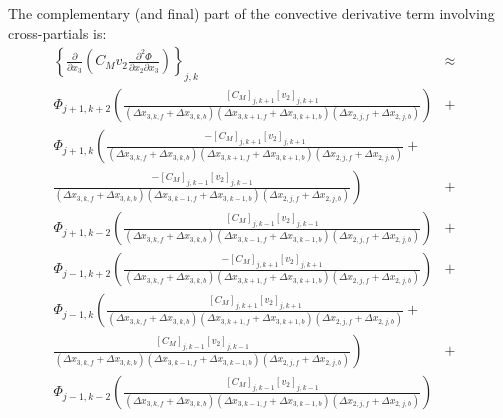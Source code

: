 \documentclass[11pt,letterpaper]{article}
\begin{document}
The complementary (and final) part of the convective derivative term involving cross-partials is:  
\begin{eqnarray}
\left\{ \frac{\partial}{\partial x_3} \left( C_M v_2 \frac{\partial^2 \Phi }{\partial x_2 \partial x_3} \right) \right\}_{j,k} &\approx& \nonumber \\
\Phi_{j+1,k+2} \left( \frac{[C_M]_{j,k+1} [v_2]_{j,k+1} }{ \left( \Delta x_{3,k,f}+\Delta x_{3,k,b} \right) \left( \Delta x_{3,k+1,f}+\Delta x_{3,k+1,b} \right) \left( \Delta x_{2,j,f}+\Delta x_{2,j,b} \right) } \right) &+& \nonumber \\
\Phi_{j+1,k} \left( \frac{-[C_M]_{j,k+1} [v_2]_{j,k+1} }{ \left( \Delta x_{3,k,f}+\Delta x_{3,k,b} \right) \left( \Delta x_{3,k+1,f}+\Delta x_{3,k+1,b} \right) \left( \Delta x_{2,j,f}+\Delta x_{2,j,b} \right) } \right. + &~& \nonumber \\
\left. \frac{-[C_M]_{j,k-1} [v_2]_{j,k-1} }{ \left( \Delta x_{3,k,f}+\Delta x_{3,k,b} \right) \left( \Delta x_{3,k-1,f}+\Delta x_{3,k-1,b} \right) \left( \Delta x_{2,j,f}+\Delta x_{2,j,b} \right) } \right) &+& \nonumber \\
\Phi_{j+1,k-2} \left( \frac{[C_M]_{j,k-1} [v_2]_{j,k-1} }{ \left( \Delta x_{3,k,f}+\Delta x_{3,k,b} \right) \left( \Delta x_{3,k-1,f}+\Delta x_{3,k-1,b} \right) \left( \Delta x_{2,j,f}+\Delta x_{2,j,b} \right) } \right) &+& \nonumber \\
\Phi_{j-1,k+2} \left( \frac{-[C_M]_{j,k+1} [v_2]_{j,k+1} }{ \left( \Delta x_{3,k,f}+\Delta x_{3,k,b} \right) \left( \Delta x_{3,k+1,f}+\Delta x_{3,k+1,b} \right) \left( \Delta x_{2,j,f}+\Delta x_{2,j,b} \right) } \right) &+& \nonumber \\
\Phi_{j-1,k} \left( \frac{[C_M]_{j,k+1} [v_2]_{j,k+1} }{ \left( \Delta x_{3,k,f}+\Delta x_{3,k,b} \right) \left( \Delta x_{3,k+1,f}+\Delta x_{3,k+1,b} \right) \left( \Delta x_{2,j,f}+\Delta x_{2,j,b} \right) } \right. + &~& \nonumber \\
\left. \frac{[C_M]_{j,k-1} [v_2]_{j,k-1} }{ \left( \Delta x_{3,k,f}+\Delta x_{3,k,b} \right) \left( \Delta x_{3,k-1,f}+\Delta x_{3,k-1,b} \right) \left( \Delta x_{2,j,f}+\Delta x_{2,j,b} \right) } \right) &+& \nonumber \\
\Phi_{j-1,k-2} \left( \frac{[C_M]_{j,k-1} [v_2]_{j,k-1} }{ \left( \Delta x_{3,k,f}+\Delta x_{3,k,b} \right) \left( \Delta x_{3,k-1,f}+\Delta x_{3,k-1,b} \right) \left( \Delta x_{2,j,f}+\Delta x_{2,j,b} \right) } \right) 
\end{eqnarray}
\end{document}
